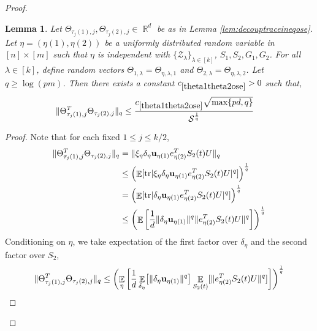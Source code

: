 \documentclass[11pt]{amsart}
\numberwithin{equation}{section}
\numberwithin{equation}{section}
\DeclareMathOperator{\E}{\mathbb{E}}
\DeclareMathOperator{\R}{\mathbb{R}}
\DeclareMathOperator*{\tr}{tr}
\DeclarePairedDelimiter{\norm}{\lVert}{\rVert}
\DeclarePairedDelimiter{\abs}{\lvert}{\rvert}
\DeclarePairedDelimiter{\sqbr}{[}{]}
\newtheorem{lemma}[theorem]{Lemma}
\theoremstyle{remark}
\theoremstyle{definition}
\begin{document}
\begin{proof}
\begin{lemma} \label{theta1theta2ose}
Let $\Theta_{\tau_j(1),j}, \Theta_{\tau_j(2),j} \in \R^d$ be as in Lemma \ref{lem:decouptraceineqose}. Let $\eta = (\eta(1), \eta(2))$ be a uniformly distributed random variable in $[n]\times[m]$ such that $\eta$ is independent with $\{\mathcal{Z}_{\lambda}\}_{\lambda \in [k]}$, $S_1, S_2, G_1, G_2$. For all $\lambda \in [k]$, define random vectors $\Theta_{1, \lambda} = \Theta_{\eta, \lambda, 1}$ and $\Theta_{2, \lambda} = \Theta_{\eta, \lambda, 2}$. Let $q \ge \log(pm)$. Then there exists a constant $c_{\ref*{theta1theta2ose}} >0$ such that,
\begin{align*}
\norm{\Theta_{\tau_j(1),j}^T\Theta_{\tau_j(2),j}}_{q} &\le  \frac{ c_{\ref*{theta1theta2ose}}\sqrt{\max \{ pd, q \}} }{\mathcal{S}^\frac{1}{q}}
\end{align*}
\end{lemma}

\begin{proof}
Note that for each fixed $1 \le j \le k/2$, 
\begin{align*}
    \norm{\Theta_{\tau_j(1),j}^T\Theta_{\tau_j(2),j}}_{q} &= \norm{\xi_{\eta} \delta_{\eta} \mathbf{u}_{\eta(1)} e_{\eta(2)}^TS_2(t)U}_{q} \\
    &\le \left( \E [\tr \abs{\xi_{\eta} \delta_{\eta} \mathbf{u}_{\eta(1)} e_{\eta(2)}^TS_2(t)U}^{q} ] \right)^\frac{1}{q} \\
    &= \left( \E [\tr \abs{ \delta_{\eta} \mathbf{u}_{\eta(1)} e_{\eta(2)}^TS_2(t)U}^{q} ] \right)^\frac{1}{q} \\
    &\le \left( \E \left[ \frac{1}{d} \norm{ \delta_{\eta} \mathbf{u}_{\eta(1)} }^{q}\norm{e_{\eta(2)}^TS_2(t)U}^{q} \right] \right)^\frac{1}{q} \\
\end{align*} 
Conditioning on $\eta$, we take expectation of the first factor over $\delta_{\eta}$ and the second factor over $S_2$,  
\begin{align*}
    \norm{\Theta_{\tau_j(1),j}^T\Theta_{\tau_j(2),j}}_{q} &\le \left( \E_{\eta} \left[ \frac{1}{d} \E_{\delta_{\eta}}\sqbr*{\norm{\delta_{\eta} \mathbf{u}_{\eta(1)} }^{q}} \E_{S_2(t)}[ \norm{e_{\eta(2)}^TS_2(t)U}^{q}] \right] \right)^\frac{1}{q} \\
\end{align*}


\end{proof}
\end{proof}
\end{document}
